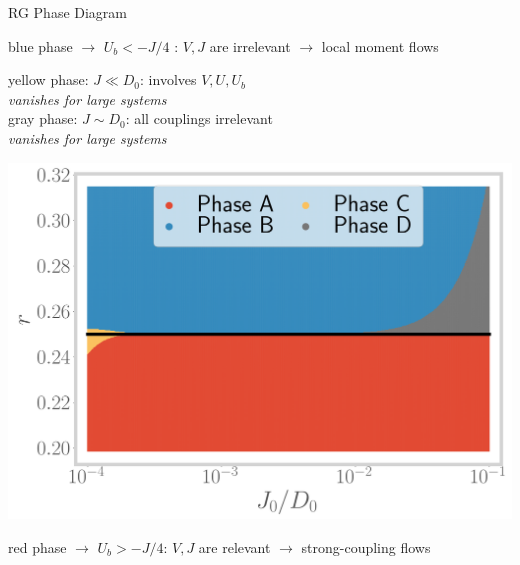 \documentclass[8pt,aspectratio=169]{beamer}
\begin{document}
\begin{frame}{RG Phase Diagram}
\centering

\flushright
\begin{minipage}{0.7\textwidth}
\begin{enumerate}
\nitem blue phase \(\longrightarrow\) \(U_b < -J/4\) : \(V,J\) are \alert{irrelevant} \(\longrightarrow\) local moment flows
\end{enumerate}
\end{minipage}

\vspace*{\fill}

\begin{minipage}{0.45\textwidth}
\begin{enumerate}
\nitem yellow phase: \(J \ll D_0\): involves \alert{\(V,U,U_b\)}\\[5pt]
{\it vanishes for large systems}\\
\vspace*{40pt}
\nitem gray phase: \(J \sim D_0\): \alert{all} couplings irrelevant\\[5pt]
{\it vanishes for large systems}
\end{enumerate}
\end{minipage}
\hspace*{\fill}
\begin{minipage}{0.5\textwidth}
\includegraphics[width=\textwidth]{phase-map-MIT.png}
\end{minipage}

\vspace*{\fill}

\flushright
\begin{minipage}{0.7\textwidth}
\begin{enumerate}
\nitem red phase \(\longrightarrow\) \(U_b > -J/4\): \(V,J\) are \alert{relevant} \(\longrightarrow\) strong-coupling flows
\end{enumerate}
\end{minipage}

\end{frame}
\end{document}
